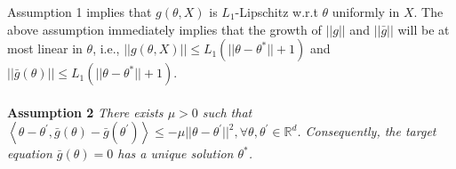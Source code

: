 \documentclass[a4paper]{article}
\begin{document}
Assumption 1 implies that $g\left(\theta, X\right)$ is $L_{1}$-Lipschitz w.r.t $\theta$ uniformly in $X$. The above assumption immediately implies that the growth of $||g||$ and $||\bar{g}||$ will be at most linear in $\theta$, i.e., $||g\left(\theta, X\right)|| \le L_{1}\left(||\theta - \theta^{*}|| + 1\right)$ and $||\bar{g}\left(\theta\right)|| \le L_{1}\left(||\theta - \theta^{*}|| + 1\right)$. 
\\
\\
\textbf{Assumption 2} \textit{
	There exists $\mu > 0$ such that $\left\langle \theta - \theta^{\prime}, \bar{g}(\theta) - \bar{g}(\theta^{\prime}) \right\rangle \le -\mu||\theta - \theta^{\prime}||^{2}, \forall \theta, \theta^{\prime} \in \mathbb{R}^{d}$. Consequently, the target equation $\bar{g}(\theta) = 0$ has a unique solution $\theta^{*}$.
}
\\
\end{document}
